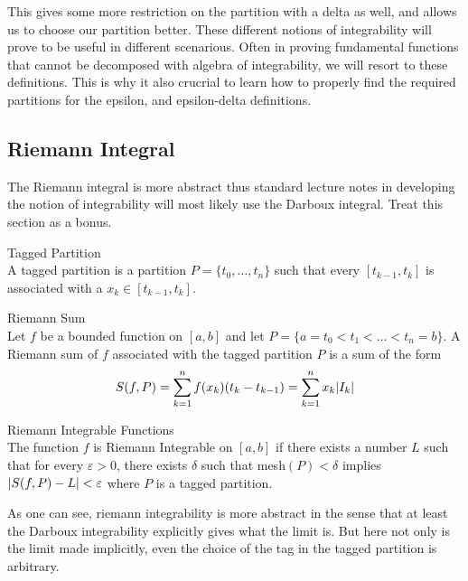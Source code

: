 \documentclass[a4paper]{article}
\begin{document}
This gives some more restriction on the partition with a delta as well, and allows us to choose our partition better. These different notions of integrability will prove to be useful in different scenarious. Often in proving fundamental functions that cannot be decomposed with algebra of integrability, we will resort to these definitions. This is why it also crucrial to learn how to properly find the required partitions for the epsilon, and epsilon-delta definitions. 

\subsection{Riemann Integral}
The Riemann integral is more abstract thus standard lecture notes in developing the notion of integrability will most likely use the Darboux integral. Treat this section as a bonus. 

\begin{defn}{Tagged Partition}{}\\ A tagged partition is a partition $P=\{t_0,\dots,t_n\}$ such that every $[t_{k-1},t_k]$ is associated with a $x_k\in[t_{k-1},t_k]$. 
\end{defn}

\begin{defn}{Riemann Sum}{}\\ Let $f$ be a bounded function on $[a,b]$ and let $P=\{a=t_0<t_1<\dots<t_n=b\}$. A Riemann sum of $f$ associated with the tagged partition $P$ is a sum of the form $$S(f,P)=\sum_{k=1}^{n}f(x_k)(t_k-t_{k-1})=\sum_{k=1}^nx_k\abs{I_k}$$
\end{defn}

\begin{defn}{Riemann Integrable Functions}{}\\ The function $f$ is Riemann Integrable on $[a,b]$ if there exists a number $L$ such that for every $\varepsilon>0$, there exists $\delta$ such that mesh$(P)<\delta$ implies $\abs{S(f,P)-L}<\varepsilon$ where $P$ is a tagged partition. 
\end{defn}

As one can see, riemann integrability is more abstract in the sense that at least the Darboux integrability explicitly gives what the limit is. But here not only is the limit made implicitly, even the choice of the tag in the tagged partition is arbitrary. 
\end{document}
